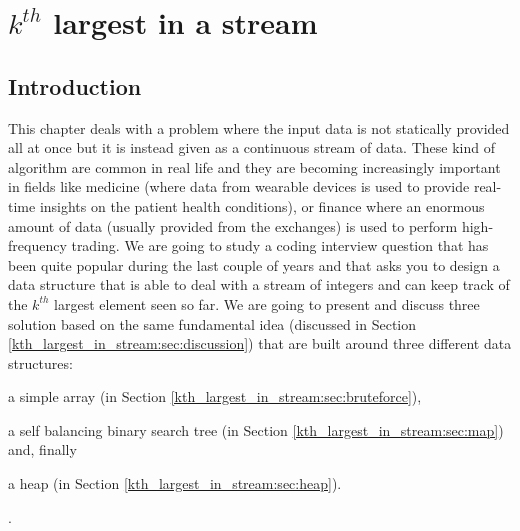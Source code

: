 %

\chapter{$k^{th}$ largest in a stream}
\label{ch:kth_largest_in_stream}
\section*{Introduction}
This chapter deals with a problem where the input data is not statically provided all at once but it
 is instead given as a continuous stream of data. These kind of algorithm are common in real life
 and they are becoming increasingly important in fields like medicine (where data from wearable
 devices is used to provide real-time insights on the patient health conditions), or finance where
 an enormous amount of data (usually provided from the exchanges) is used to perform high-frequency
 trading. We are going to study a coding interview question that has been quite popular  during the
 last couple of years and that asks you to design a data structure that is able to deal with a
 stream of integers and can keep track of the $k^{th}$ largest element seen so far. We are going to
 present and discuss three solution based on the same fundamental idea (discussed in Section
 \ref{kth_largest_in_stream:sec:discussion}) that are built around  three different data structures:
 
\begin{enumerate*}
	\item a simple array (in Section \ref{kth_largest_in_stream:sec:bruteforce}), 
	\item a self balancing binary search tree (in Section \ref{kth_largest_in_stream:sec:map})  and,
	finally 
	\item a heap (in Section \ref{kth_largest_in_stream:sec:heap}). \end{enumerate*}.

